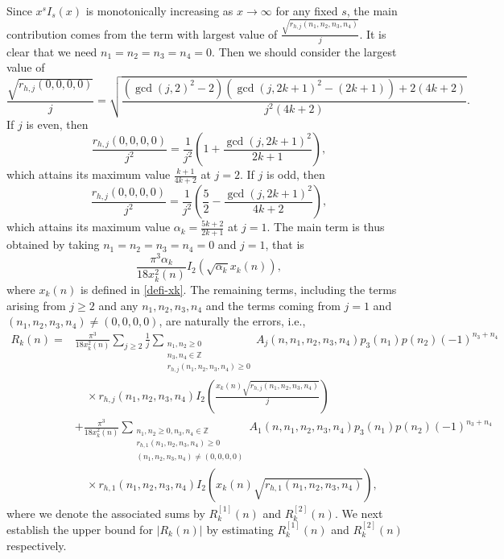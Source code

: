 \documentclass[12pt]{article}
\numberwithin{equation}{section}
\begin{document}
Since $x^sI_s(x)$ is monotonically increasing as $x\rightarrow\infty$ for any fixed $s$, the main contribution comes from the term with largest value of $\frac{\sqrt{r_{h,j}(n_1,n_2,n_3,n_4)}}{j}$. It is clear that we need $n_1=n_2=n_3=n_4=0$. Then we should consider the largest value of
\begin{equation*}
\frac{\sqrt{r_{h,j}(0,0,0,0)}}{j}=\sqrt{\frac{\left(\gcd(j,2)^2-2\right)\left(\gcd(j,2k+1)^2
-(2k+1)\right)+2(4k+2)}{j^2(4k+2)}}.
\end{equation*}
If $j$ is even, then
\begin{equation*}
\frac{r_{h,j}(0,0,0,0)}{j^2}
=\frac{1}{j^2}\left(1+\frac{\gcd(j,2k+1)^2}{2k+1}\right),
\end{equation*}
which attains its maximum value $\frac{k+1}{4k+2}$ at $j=2$.
If $j$ is odd, then
\begin{equation*}
\frac{r_{h,j}(0,0,0,0)}{j^2}
=\frac{1}{j^2}\left(\frac{5}{2}-\frac{\gcd(j,2k+1)^2}{4k+2}\right),
\end{equation*}
which attains its maximum value $\alpha_k=\frac{5k+2}{2k+1}$ at $j=1$. The main term is thus obtained by taking $n_1=n_2=n_3=n_4=0$ and $j=1$, that is
\begin{equation*}
\frac{ \pi^3\alpha_k}{18 {x^2_{k}(n)}} I_2\left(\sqrt{\alpha_k } {x_{k}(n)}\right),
\end{equation*}
where $x_{k}(n)$ is defined in \eqref{defi-xk}. The remaining terms, including the terms arising from $j\geq 2$ and any $n_1,n_2,n_3,n_4$ and the terms coming from $j=1$ and $(n_1,n_2,n_3,n_4)\neq(0,0,0,0)$, are naturally the errors, i.e.,
\begin{align*}
R_{k}(n)=&\frac{ \pi^3}{18 x^2_{k}(n)}\sum_{j\geq 2 } \frac{1}{j}
\sum_{\substack{n_1,n_2\geq 0 \\ n_3,n_4\in \mathbb{Z} \\r_{h,j}(n_1,n_2,n_3,n_4)\geq 0}}A_{j}(n,n_1,n_2,n_3,n_4)p_3(n_1)p(n_2)(-1)^{n_3+n_4}
\\
&\quad \times r_{h,j}(n_1,n_2,n_3,n_4) I_{2} \left( \frac{x_{k}(n)\sqrt{r_{h,j}(n_1,n_2,n_3,n_4)}}{j}  \right)
\\
&+\frac{ \pi^3}{18 x^2_{k}(n)}
\sum_{\substack{n_1,n_2\geq 0, n_3,n_4\in \mathbb{Z} \\r_{h,1}(n_1,n_2,n_3,n_4)\geq 0\\ (n_1,n_2,n_3,n_4)\neq(0,0,0,0)}}A_{1}(n,n_1,n_2,n_3,n_4)p_3(n_1)p(n_2)(-1)^{n_3+n_4}
\\
&\quad \times r_{h,1}(n_1,n_2,n_3,n_4) I_{2} \left( x_{k}(n)\sqrt{r_{h,1}(n_1,n_2,n_3,n_4)}  \right),
\end{align*}
where we denote the associated sums by $R_{k}^{[1]}(n)$ and $R_{k}^{[2]}(n)$.
We next establish the upper bound for $|R_{k}(n)|$ by estimating $R_{k}^{[1]}(n)$ and $R_{k}^{[2]}(n)$ respectively.
\end{document}
